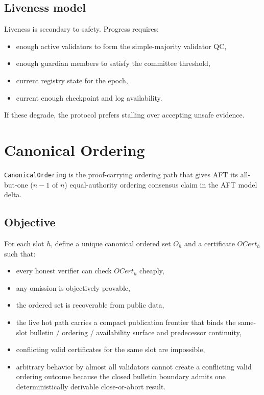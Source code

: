 \documentclass[11pt]{article}
\newcommand{\AFT}{\textsc{AFT}}
\newcommand{\code}[1]{\texttt{#1}}
\begin{document}
\subsection{Liveness model}

Liveness is secondary to safety. Progress requires:

\begin{itemize}[leftmargin=1.5em]
\item enough active validators to form the simple-majority validator QC,
\item enough guardian members to satisfy the committee threshold,
\item current registry state for the epoch,
\item current enough checkpoint and log availability.
\end{itemize}

If these degrade, the protocol prefers stalling over accepting unsafe evidence.

\section{Canonical Ordering}

\code{CanonicalOrdering} is the proof-carrying ordering path that gives
\AFT{} its all-but-one (\(n-1\) of \(n\)) equal-authority ordering consensus
claim in the AFT model delta.

\subsection{Objective}

For each slot \(h\), define a unique canonical ordered set \(O_h\) and a
certificate \(OCert_h\) such that:

\begin{itemize}[leftmargin=1.5em]
\item every honest verifier can check \(OCert_h\) cheaply,
\item any omission is objectively provable,
\item the ordered set is recoverable from public data,
\item the live hot path carries a compact publication frontier that binds the
same-slot bulletin / ordering / availability surface and predecessor
continuity,
\item conflicting valid certificates for the same slot are impossible,
\item arbitrary behavior by almost all validators cannot create a conflicting
valid ordering outcome because the closed bulletin boundary admits one
deterministically derivable close-or-abort result.
\end{itemize}
\end{document}
